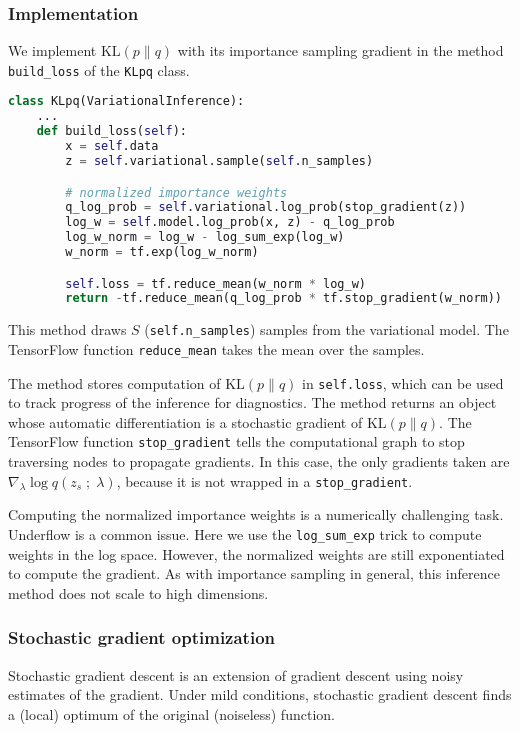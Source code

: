 \subsubsection{Implementation}

We implement $\text{KL}(p\|q)$ with its importance sampling gradient
in the method \texttt{build_loss} of the \texttt{KLpq} class.
\begin{lstlisting}[language=Python]
class KLpq(VariationalInference):
    ...
    def build_loss(self):
        x = self.data
        z = self.variational.sample(self.n_samples)

        # normalized importance weights
        q_log_prob = self.variational.log_prob(stop_gradient(z))
        log_w = self.model.log_prob(x, z) - q_log_prob
        log_w_norm = log_w - log_sum_exp(log_w)
        w_norm = tf.exp(log_w_norm)

        self.loss = tf.reduce_mean(w_norm * log_w)
        return -tf.reduce_mean(q_log_prob * tf.stop_gradient(w_norm))
\end{lstlisting}

This method draws $S$ (\texttt{self.n_samples}) samples from the variational
model. The TensorFlow function \texttt{reduce_mean} takes the
mean over the samples.

The method stores computation of $\text{KL}(p\|q)$ in
\texttt{self.loss}, which can be used to track progress of the
inference for diagnostics.  The method returns an object whose
automatic differentiation is a stochastic gradient of $\text{KL}(p\|q)$.
The TensorFlow function \texttt{stop_gradient} tells the computational
graph to stop traversing nodes to propagate gradients. In this case,
the only gradients taken are $\nabla_\lambda \log q(z_s\;;\;\lambda)$,
because it is not wrapped in a \texttt{stop_gradient}.

Computing the normalized importance weights is a numerically challenging task.
Underflow is a common issue. Here we use the \texttt{log_sum_exp} trick to
compute weights in the log space. However, the normalized weights are still
exponentiated to compute the gradient. As with importance sampling in
general, this inference method does not scale to high dimensions.

\subsubsection{Stochastic gradient optimization}

Stochastic gradient descent is an extension of gradient descent using
noisy estimates of the gradient. Under mild conditions, stochastic
gradient descent finds a (local) optimum of the original (noiseless)
function.

